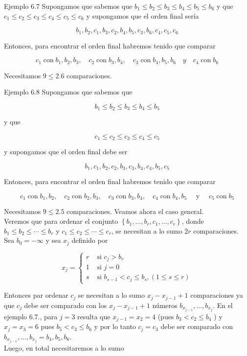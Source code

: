 \documentclass[10pt]{article}
\begin{document}
Ejemplo 6.7 Supongamos que sabemos que $b_{1} \leq b_{2} \leq b_{3} \leq b_{4} \leq b_{5} \leq b_{6}$ y que $c_{1} \leq c_{2} \leq c_{3} \leq c_{4} \leq c_{5} \leq c_{6}$ y supongamos que el orden final sería

$$
b_{1}, b_{2}, c_{1}, b_{3}, c_{2}, b_{4}, b_{5}, c_{3}, b_{6}, c_{4}, c_{5}, c_{6}
$$

Entonces, para encontrar el orden final habremos tenido que comparar

$$
c_{1} \operatorname{con} b_{1}, b_{2}, b_{3}, \quad c_{2} \operatorname{con} b_{3}, b_{4}, \quad c_{3} \operatorname{con} b_{4}, b_{5}, b_{6} \quad y \quad c_{4} \operatorname{con} b_{6}
$$

Necesitamos $9 \leq 2.6$ comparaciones.

Ejemplo 6.8 Supongamos que sabemos que

$$
b_{1} \leq b_{2} \leq b_{3} \leq b_{4} \leq b_{5}
$$

y que

$$
c_{1} \leq c_{2} \leq c_{3} \leq c_{4} \leq c_{5}
$$

y supongamos que el orden final debe ser

$$
b_{1}, c_{1}, b_{2}, c_{2}, b_{3}, c_{3}, b_{4}, c_{4}, b_{5}, c_{5}
$$

Entonces, para encontrar el orden final habremos tenido que comparar

$$
c_{1} \operatorname{con} b_{1}, b_{2}, \quad c_{2} \operatorname{con} b_{2}, b_{3}, \quad c_{3} \operatorname{con} b_{3}, b_{4}, \quad c_{4} \operatorname{con} b_{4}, b_{5} \quad \text { y } \quad c_{5} \operatorname{con} b_{5}
$$

Necesitamos $9 \leq 2.5$ comparaciones. Veamos ahora el caso general.\\
Veremos que para ordenar el conjunto $\left\{b_{1}, \ldots, b_{r}, c_{1}, \ldots, c_{r}\right\}$, donde $b_{1} \leq b_{2} \leq \cdots \leq b_{r}$ y $c_{1} \leq c_{2} \leq \cdots \leq c_{r}$, se necesitan a lo sumo $2 r$ comparaciones. Sea $b_{0}=-\infty$ y sea $x_{j}$ definido por

$$
x_{j}= \begin{cases}r & \text { si } c_{j}>b_{r} \\ 1 & \text { si } j=0 \\ s & \text { si } b_{s-1}<c_{j} \leq b_{s},(1 \leq s \leq r)\end{cases}
$$

Entonces par ordenar $c_{j}$ se necesitan a lo sumo $x_{j}-x_{j-1}+1$ comparaciones ya que $c_{j}$ debe ser comparado con los $x_{j}-x_{j-1}+1$ números $b_{x_{j-1}}, \ldots, b_{x_{j}}$. En el ejemplo 6.7., para $j=3$ resulta que $x_{j-1}=x_{2}=4$ (pues $b_{3}<c_{2} \leq b_{4}$ ) y $x_{j}=x_{3}=6$ pues $b_{5}<c_{3} \leq b_{6}$ y por lo tanto $c_{j}=c_{3}$ debe ser comparado con $b_{x_{j-1}}, \ldots, b_{x_{j}}=b_{4}, b_{5}, b_{6}$.\\
Luego, en total necesitaremos a lo sumo
\end{document}
